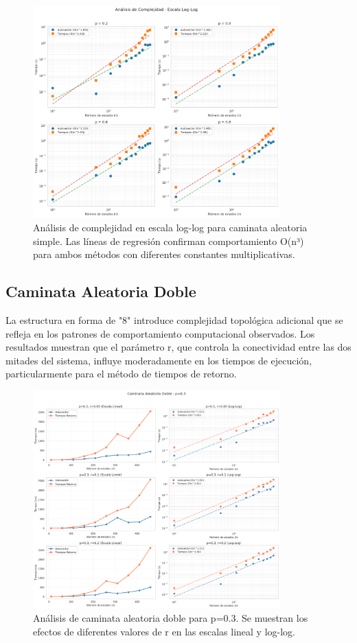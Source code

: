 \begin{figure}[h]
\centering
\includegraphics[width=0.85\textwidth]{../images/caminata_simple_loglog.png}
\caption{Análisis de complejidad en escala log-log para caminata aleatoria simple. Las líneas de regresión confirman comportamiento O(n³) para ambos métodos con diferentes constantes multiplicativas.}
\label{fig:caminata_simple_loglog}
\end{figure}

\subsection{Caminata Aleatoria Doble}

La estructura en forma de "8" introduce complejidad topológica adicional que se refleja en los patrones de comportamiento computacional observados. Los resultados muestran que el parámetro r, que controla la conectividad entre las dos mitades del sistema, influye moderadamente en los tiempos de ejecución, particularmente para el método de tiempos de retorno.

\begin{figure}[h]
\centering
\includegraphics[width=0.85\textwidth]{../images/caminata_doble_p_0.3.png}
\caption{Análisis de caminata aleatoria doble para p=0.3. Se muestran los efectos de diferentes valores de r en las escalas lineal y log-log.}
\label{fig:caminata_doble_p03}
\end{figure}

